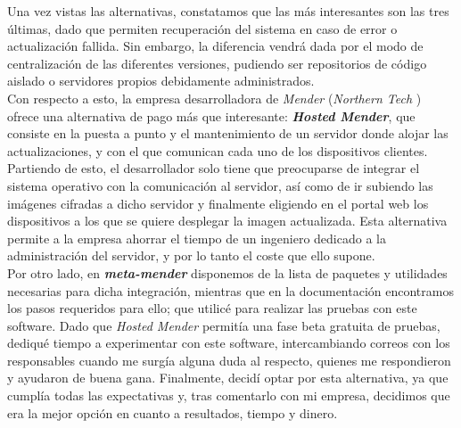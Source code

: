 Una vez vistas las alternativas, constatamos que las más interesantes son las tres últimas, dado que permiten recuperación del sistema en caso de error o actualización fallida. Sin embargo, la diferencia vendrá dada por el modo de centralización de las diferentes versiones, pudiendo ser repositorios de código aislado o servidores propios debidamente administrados.\\

Con respecto a esto, la empresa desarrolladora de \textit{Mender} (\textit{Northern Tech} \cite{northern-tech}) ofrece una alternativa de pago más que interesante: \textbf{\textit{Hosted Mender}}, que consiste en la puesta a punto y el mantenimiento de un servidor donde alojar las actualizaciones, y con el que comunican cada uno de los dispositivos clientes. Partiendo de esto, el desarrollador solo tiene que preocuparse de integrar el sistema operativo con la comunicación al servidor, así como de ir subiendo las imágenes cifradas a dicho servidor y finalmente eligiendo en el portal web los dispositivos a los que se quiere desplegar la imagen actualizada. Esta alternativa permite a la empresa ahorrar el tiempo de un ingeniero dedicado a la administración del servidor, y por lo tanto el coste que ello supone.\\

Por otro lado, en \textbf{\textit{meta-mender}} \cite{meta-mender} disponemos de la lista de paquetes y utilidades necesarias para dicha integración, mientras que en la documentación \cite{docs-mender} encontramos los pasos requeridos para ello; que utilicé para realizar las pruebas con este software. Dado que \textit{Hosted Mender} permitía una fase beta gratuita de pruebas, dediqué tiempo a experimentar con este software, intercambiando correos con los responsables cuando me surgía alguna duda al respecto, quienes me respondieron y ayudaron de buena gana. Finalmente, decidí optar por esta alternativa, ya que cumplía todas las expectativas y, tras comentarlo con mi empresa, decidimos que era la mejor opción en cuanto a resultados, tiempo y dinero.

\newpage
